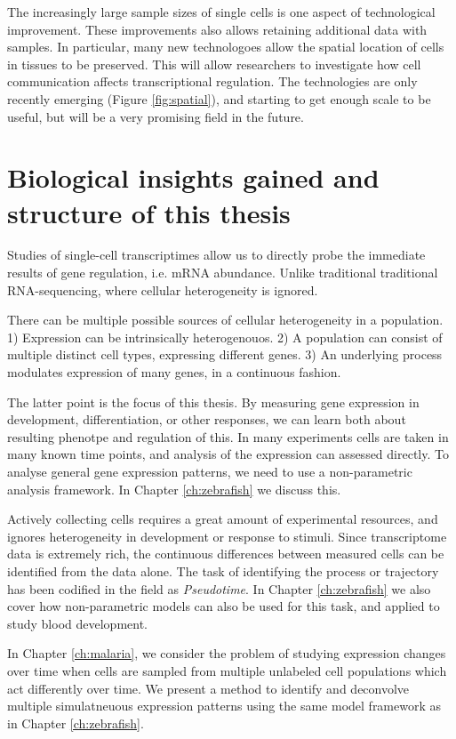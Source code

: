 The increasingly large sample sizes of single cells is one aspect of technological improvement. These improvements also allows retaining additional data with samples. In particular, many new technologoes allow the spatial location of cells in tissues to be preserved. This will allow researchers to investigate how cell communication affects transcriptional regulation. The technologies are only recently emerging (Figure \ref{fig:spatial}), and starting to get enough scale to be useful, but will be a very promising field in the future.

\section{Biological insights gained and structure of this thesis}

Studies of single-cell transcriptimes allow us to directly probe the immediate results of gene regulation, i.e. mRNA abundance. Unlike traditional traditional RNA-sequencing, where cellular heterogeneity is ignored.

There can be multiple possible sources of cellular heterogeneity in a population. 1) Expression can be intrinsically heterogenouos. 2) A population can consist of multiple distinct cell types, expressing different genes. 3) An underlying process modulates expression of many genes, in a continuous fashion.

The latter point is the focus of this thesis. By measuring gene expression in development, differentiation, or other responses, we can learn both about resulting phenotpe and regulation of this. In many experiments cells are taken in many known time points, and analysis of the expression can assessed directly. To analyse general gene expression patterns, we need to use a non-parametric analysis framework. In Chapter \ref{ch:zebrafish} we discuss this.

Actively collecting cells requires a great amount of experimental resources, and ignores heterogeneity in development or response to stimuli. Since transcriptome data is extremely rich, the continuous differences between measured cells can be identified from the data alone. The task of identifying the process or trajectory has been codified in the field as \textit{Pseudotime}. In Chapter \ref{ch:zebrafish} we also cover how non-parametric models can also be used for this task, and applied to study blood development.

In Chapter \ref{ch:malaria}, we consider the problem of studying expression changes over time when cells are sampled from multiple unlabeled cell populations which act differently over time. We present a method to identify and deconvolve multiple simulatneuous expression patterns using the same model framework as in Chapter \ref{ch:zebrafish}.

